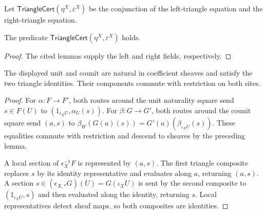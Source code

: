 \begin{definition}
\label{def:weil-efi-site-triangle-certificate}
Let $\mathsf{TriangleCert}(\eta^X,\varepsilon^X)$ be the conjunction of the
left-triangle equation and the right-triangle equation.
\end{definition}

\begin{proposition}
\label{prop:weil-efi-site-triangle-certificate}
The predicate $\mathsf{TriangleCert}(\eta^X,\varepsilon^X)$ holds.
\end{proposition}
\begin{proof}
The cited lemmas supply the left and right fields, respectively.
\end{proof}

\begin{lemma}
\label{lemma:weil-pbc-epsilon-adjunction-equations-v1}
The displayed unit and counit are natural in coefficient sheaves and satisfy
the two triangle identities.  Their components commute with restriction on
both sites.
\end{lemma}
\begin{proof}
For $\alpha:F\to F'$, both routes around the unit naturality square send
$s\in F(U)$ to $(1_{\iota_XU},\alpha_U(s))$.  For $\beta:G\to G'$, both
routes around the counit square send $(a,s)$ to
$\beta_W(G(a)(s))=G'(a)(\beta_{\iota_XU}(s))$.  These equalities commute
with restriction and descend to sheaves by the preceding lemma.

A local section of $\epsilon_X^{-1}F$ is represented by $(a,s)$.  The first
triangle composite replaces $s$ by its identity representative and evaluates
along $a$, returning $(a,s)$.  A section
$s\in(\epsilon_{X,*}G)(U)=G(\iota_XU)$ is sent by the second composite to
$(1_{\iota_XU},s)$ and then evaluated along the identity, returning $s$.
Local representatives detect sheaf maps, so both composites are identities.
\end{proof}

